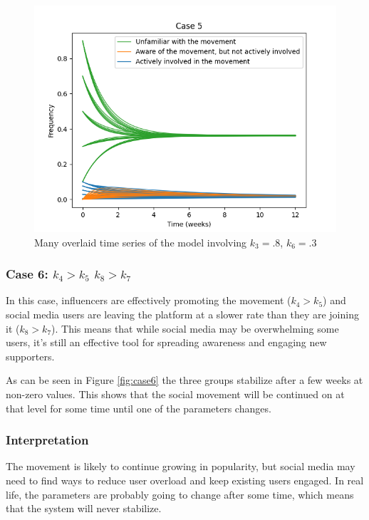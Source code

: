 \documentclass{article}
\begin{document}
    \begin{figure}[H]

        \centering
        \includegraphics[width=\textwidth]{simulation/plots/case5.png}   
        \caption{Many overlaid time series of the model involving \mbox{$k_3=.8$}, \mbox{$k_6=.3$}}
        \label{fig:case5}
    \end{figure}


    \subsubsection*{Case 6: $k_4 > k_5$  $k_8 > k_7$}
    In this case, influencers are effectively promoting the movement ($k_4 > k_5$) and social media users are leaving the platform at a slower rate than they are joining it ($k_8 > k_7$). This means that while social media may be overwhelming some users, it's still an effective tool for spreading awareness and engaging new supporters.

    As can be seen in Figure \ref{fig:case6} the three groups stabilize after a few weeks at non-zero values. This shows that the social movement will be continued on at that level for some time until one of the parameters changes.
    \subsubsection*{Interpretation}
    The movement is likely to continue growing in popularity, but social media may need to find ways to reduce user overload and keep existing users engaged. In real life, the parameters are probably going to change after some time, which means that the system will never stabilize.
\end{document}
